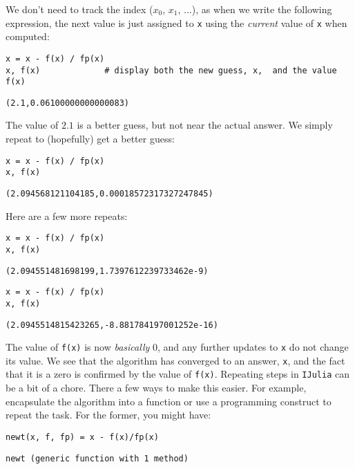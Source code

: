 \documentclass[12pt]{article}
\begin{document}
\newline
We don't need to track the index ($x_0$, $x_1$, ...), as when we write the following expression, the next value is just assigned to \texttt{x} using the \textit{current} value of \texttt{x} when computed:\begin{verbatim}
x = x - f(x) / fp(x)
x, f(x)				# display both the new guess, x,  and the value f(x)
\end{verbatim}
\begin{verbatim}
(2.1,0.06100000000000083)\end{verbatim}
\newline
The value of $2.1$ is a better guess, but not near the actual answer. We simply repeat to (hopefully) get a better guess:\begin{verbatim}
x = x - f(x) / fp(x)
x, f(x)
\end{verbatim}
\begin{verbatim}
(2.094568121104185,0.00018572317327247845)\end{verbatim}
\newline
Here are a few more repeats:\begin{verbatim}
x = x - f(x) / fp(x)
x, f(x)
\end{verbatim}
\begin{verbatim}
(2.094551481698199,1.7397612239733462e-9)\end{verbatim}
\begin{verbatim}
x = x - f(x) / fp(x)
x, f(x)
\end{verbatim}
\begin{verbatim}
(2.0945514815423265,-8.881784197001252e-16)\end{verbatim}
\newline
The value of \texttt{f(x)} is now \textit{basically} 0, and any further updates to \texttt{x} do not change its value. We see that the algorithm has converged to an answer, \texttt{x}, and the fact that it is a zero is confirmed by the value of \texttt{f(x)}.\newline
Repeating steps in \texttt{IJulia} can be a bit of a chore. There a few  ways to make this easier. For example, encapsulate the algorithm into a function or use a programming construct to repeat the task.\newline
For the former, you might have:\begin{verbatim}
newt(x, f, fp) = x - f(x)/fp(x)
\end{verbatim}
\begin{verbatim}
newt (generic function with 1 method)\end{verbatim}
\end{document}

